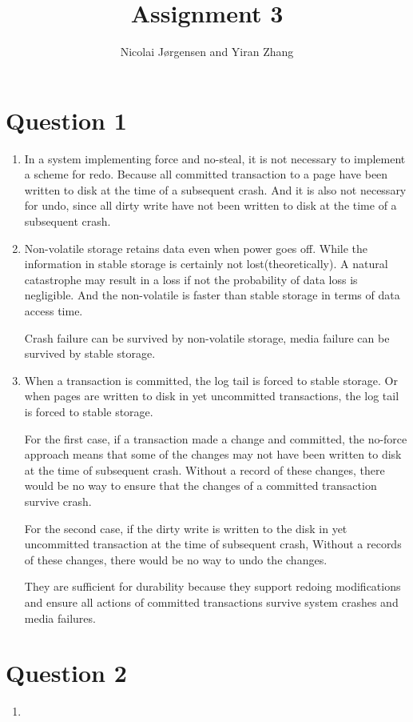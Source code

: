 \documentclass[11pt]{article}
\title          {Assignment 3}
\author         {Nicolai Jørgensen and Yiran Zhang}
\begin{document}
\maketitle
\newpage

\section{Question 1}
\begin{enumerate}
	\item
	In a system implementing force and no-steal, it is not necessary to implement a scheme for redo. Because all committed transaction to a page have been written to disk at the time of a subsequent crash. And it is also not necessary for undo, since all dirty write have not been written to disk at the time of a subsequent crash.
	\item
	 Non-volatile storage retains data even when power goes off. While the information in stable storage is certainly not lost(theoretically). A natural catastrophe may result in a loss if not the probability of data loss is negligible. And the non-volatile is faster than stable storage in terms of data access time.
	 
	 Crash failure can be survived by non-volatile storage, media failure can be survived by stable storage.
	 \item
	 When a transaction is committed, the log tail is forced to stable storage. Or when pages are written to disk in yet uncommitted transactions, the log tail is forced to stable storage.

	 For the first case, if a transaction made a change and committed, the no-force approach means that some of the changes may not have been written to disk at the time of subsequent crash. Without a record of these changes, there would be no way to ensure that the changes of a committed transaction survive crash. 	
	 
	 For the second case, if the dirty write is written to the disk in yet uncommitted transaction at the time of subsequent crash, Without a records of these changes, there would be no way to undo the changes.
	 
	 They are sufficient for durability because they support redoing modifications and ensure all actions of committed transactions survive system crashes and media failures.
	 
\end{enumerate}

\section{Question 2}
\begin{enumerate}
	\item

\end{enumerate}
\end{document}
